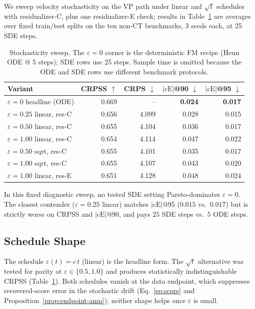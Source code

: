 \documentclass{article}
\begin{document}
We sweep velocity stochasticity on the VP path under linear and $\sqrt{t}$ schedules with residualizer-C, plus one residualizer-E check; results in Table~\ref{tab:stoch-eps} are averages over fixed train/test splits on the ten non-CT benchmarks, 3 seeds each, at 25 SDE steps.

\begin{table}[!h]
  \centering
  \caption{Stochasticity sweep. The $\varepsilon=0$ corner is the deterministic FM recipe (Heun ODE @ 5 steps); SDE rows use 25 steps. Sample time is omitted because the ODE and SDE rows use different benchmark protocols.}\label{tab:stoch-eps}
  \footnotesize
  \begin{tabular}{lrrrr}
    \toprule
    Variant & CRPSS $\uparrow$ & CRPS $\downarrow$ & $|\text{cE}|$@90 $\downarrow$ & $|\text{cE}|$@95 $\downarrow$ \\
    \midrule
    $\varepsilon=0$ headline (ODE)    & 0.669 & --     & \textbf{0.024} & \textbf{0.017} \\
    $\varepsilon=0.25$ linear, res-C  & 0.656 & 4.099  & 0.028 & 0.015 \\
    $\varepsilon=0.50$ linear, res-C  & 0.655 & 4.104  & 0.036 & 0.017 \\
    $\varepsilon=1.00$ linear, res-C  & 0.654 & 4.114  & 0.047 & 0.022 \\
    $\varepsilon=0.50$ sqrt, res-C    & 0.655 & 4.101  & 0.035 & 0.017 \\
    $\varepsilon=1.00$ sqrt, res-C    & 0.655 & 4.107  & 0.043 & 0.020 \\
    $\varepsilon=1.00$ linear, res-E  & 0.651 & 4.128  & 0.048 & 0.024 \\
    \bottomrule
  \end{tabular}
\end{table}

In this fixed diagnostic sweep, no tested SDE setting Pareto-dominates $\varepsilon=0$. The closest contender ($\varepsilon=0.25$ linear) matches $|\text{cE}|$@95 ($0.015$ vs.\ $0.017$) but is strictly worse on CRPSS and $|\text{cE}|$@90, and pays $25$ SDE steps vs.\ $5$ ODE steps.

\subsection{Schedule Shape}\label{app:stoch-schedule}

The schedule $\varepsilon(t) = c\,t$ (linear) is the headline form. The $\sqrt{t}$ alternative was tested for parity at $\varepsilon \in \{0.5, 1.0\}$ and produces statistically indistinguishable CRPSS (Table~\ref{tab:stoch-eps}). Both schedules vanish at the data endpoint, which suppresses recovered-score error in the stochastic drift (Eq.~\eqref{eq:score} and Proposition~\ref{prop:endpoint-amp}); neither shape helps once $\varepsilon$ is small.
\end{document}
